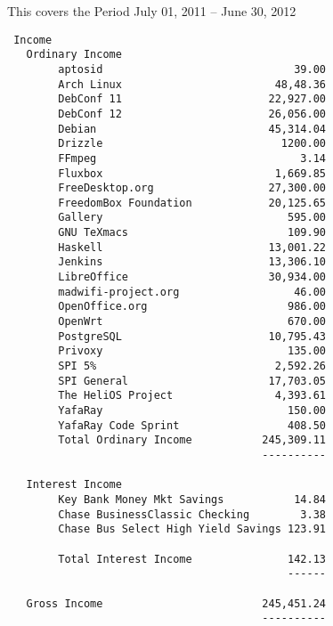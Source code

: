 \documentclass[letterpaper]{report}
\begin{document}
This covers the Period July 01, 2011 -- June 30, 2012

\begin{verbatim}
 Income
   Ordinary Income
        aptosid                              39.00
        Arch Linux                        48,48.36
        DebConf 11                       22,927.00
        DebConf 12                       26,056.00
        Debian                           45,314.04
        Drizzle                            1200.00
        FFmpeg                                3.14
        Fluxbox                           1,669.85
        FreeDesktop.org                  27,300.00
        FreedomBox Foundation            20,125.65
        Gallery                             595.00
        GNU TeXmacs                         109.90
        Haskell                          13,001.22
        Jenkins                          13,306.10
        LibreOffice                      30,934.00
        madwifi-project.org                  46.00
        OpenOffice.org                      986.00
        OpenWrt                             670.00
        PostgreSQL                       10,795.43
        Privoxy                             135.00
        SPI 5%                            2,592.26
        SPI General                      17,703.05
        The HeliOS Project                4,393.61
        YafaRay                             150.00
        YafaRay Code Sprint                 408.50
        Total Ordinary Income           245,309.11
                                        ----------

   Interest Income
        Key Bank Money Mkt Savings           14.84
        Chase BusinessClassic Checking        3.38
        Chase Bus Select High Yield Savings 123.91

        Total Interest Income               142.13
                                            ------

   Gross Income                         245,451.24
                                        ----------


\end{verbatim}
\end{document}

